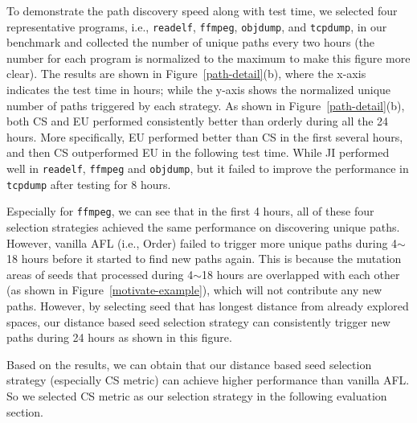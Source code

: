To demonstrate the path discovery speed along with test time, we selected four representative programs, i.e., \texttt{readelf}, \texttt{ffmpeg}, \texttt{objdump}, and \texttt{tcpdump}, in our benchmark and collected the number of unique paths every two hours (the number for each program is normalized to the maximum to make this figure more clear).
 The results are shown in Figure~\ref{path-detail}(b), where the x-axis indicates the test time in hours; while the y-axis shows the normalized unique number of paths triggered by each strategy.
As shown in Figure~\ref{path-detail}(b), both CS and EU performed consistently better than orderly during all the 24 hours.
 More specifically, EU performed better than CS in the first several hours, and then CS outperformed EU in the following test time.
 While JI performed well in \texttt{readelf}, \texttt{ffmpeg} and \texttt{objdump}, but it failed to improve the performance in \texttt{tcpdump} after testing for 8 hours.
 
 Especially for \texttt{ffmpeg}, we can see that in the first 4 hours, all of these four selection strategies achieved the same performance on discovering unique paths.
  However, vanilla AFL (i.e., Order) failed to trigger more unique paths during 4$\sim$18 hours before it started to find new paths again.
  This is because the mutation areas of seeds that processed during 4$\sim$18 hours are overlapped with each other (as shown in Figure~\ref{motivate-example}), which will not contribute any new paths.
  However, by selecting seed that has longest distance from already explored spaces, our distance based seed selection strategy can consistently trigger new paths during 24 hours as shown in this figure.

Based on the results, we can obtain that our distance based seed selection strategy (especially CS metric) can achieve higher performance than vanilla AFL.
 So we selected CS metric as our selection strategy in the following evaluation section.


